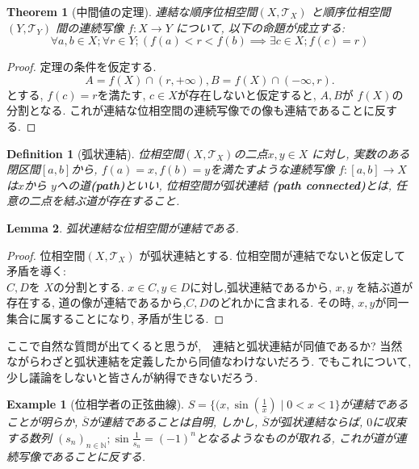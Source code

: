 \documentclass[dvipdfmx]{jbook}
\newcommand{\cl}[1]{\overline{ #1}  }
\newtheorem{theorem}{Theorem}[section]
\newtheorem{lemma}[theorem]{Lemma}
\newtheorem{definition}{Definition}[section]
\theoremstyle{remark}
\theoremstyle{plain}
\newtheorem{example}{Example}[section]
\begin{document}
\begin{theorem}[中間値の定理]
	連結な順序位相空間$\left( X ,\mathcal{T}_X \right) $ と順序位相空間$ \left( Y, \mathcal{T}_Y \right) $ 間の連続写像
	$f: X \to Y$ について, 以下の命題が成立する: 
	$$
	\forall a,b \in X; \forall r \in Y; \left( f(a)<r< f(b) \implies \exists c \in X ;f(c) =r \right)
	$$
\end{theorem}

\begin{proof}
	定理の条件を仮定する. 
	\[
	A=f(X) \cap (r, + \infty), B= f(X) \cap (- \infty, r)
	.\]
	とする, $f(c) =r$を満たす,  $c \in X$が存在しないと仮定すると,  $A,B$が $f(X)$の分割となる. 
	これが連結な位相空間の連続写像での像も連結であることに反する.
\end{proof}

\begin{definition}[弧状連結]
	位相空間$ \left( X , \mathcal{T}_X \right) $の二点$x,y \in X$ に対し, 
	実数のある閉区間$[a,b]$から,  $f(a) =x,f(b) = y$を満たすような連続写像 
	$f: [a,b] \to X$は$x$から $y$への道\textbf{(path)}といい, 
	位相空間が弧状連結 \textbf{(path connected)}とは, 任意の二点を結ぶ道が存在すること.
\end{definition}

\begin{lemma}
	弧状連結な位相空間が連結である.
\end{lemma}

\begin{proof}
	位相空間$\left( X, \mathcal{T}_X \right) $ が弧状連結とする. 
	位相空間が連結でないと仮定して矛盾を導く:　\\
	$C,D$を $X$の分割とする.  
	$x \in C, y \in D$に対し,弧状連結であるから, $x,y$ を結ぶ道が存在する, 
	道の像が連結であるから,$C,D$のどれかに含まれる.
	その時, $x,y$が同一集合に属することになり, 矛盾が生じる.
\end{proof}

ここで自然な質問が出てくると思うが,　連結と弧状連結が同値であるか? 当然ながらわざと弧状連結を定義したから同値なわけないだろう.
でもこれについて, 少し議論をしないと皆さんが納得できないだろう. 

\begin{example}[位相学者の正弦曲線]
	$S=\{(x,\sin (\frac{1}{x})  \mid 0<x< 1\} $が連結であることが明らか,
	$\cl{S}$が連結であることは自明, しかし,  $\cl{S}$が弧状連結ならば,  $0$に収束する数列 $\left( s_n \right) _{n \in \mathbb{N}}; \sin \frac{1}{s_{n}}= (-1)^n$となるようなものが取れる, これが道が連続写像であることに反する.
\end{example}
\end{document}
